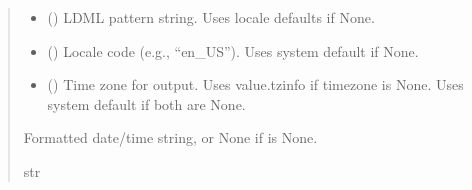 \documentclass[letterpaper,10pt,english]{sphinxmanual}
\begin{document}
\begin{fulllineitems}
\begin{fulllineitems}
\begin{quote}
\begin{description}
\begin{itemize}
\item {} 
\sphinxAtStartPar
{} () \textendash{} LDML pattern string. Uses locale defaults if None.

\item {} 
\sphinxAtStartPar
{} () \textendash{} Locale code (e.g., “en\_US”). Uses system default if None.

\item {} 
\sphinxAtStartPar
{} () \textendash{} Time zone for output.
Uses value.tzinfo if timezone is None.
Uses system default if both are None.

\end{itemize}

\sphinxAtStartPar
Formatted date/time string, or None if  is None.

\sphinxAtStartPar
str

\end{description}\end{quote}

\end{fulllineitems}



\end{fulllineitems}
\end{document}
